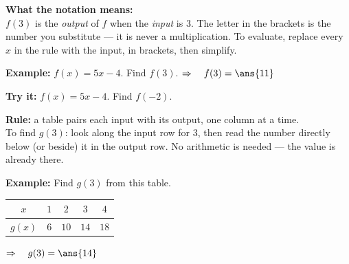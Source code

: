 \documentclass[12pt]{article}
\begin{document}


\begin{formulabox}
\textbf{What the notation means:}\\[3pt]
$f(3)$ is the \textit{output} of $f$ when the \textit{input} is $3$. The letter in the
brackets is the number you substitute --- it is never a multiplication.
To evaluate, replace every $x$ in the rule with the input, in brackets, then simplify.
\end{formulabox}

\begin{examplebox}
\textbf{Example:} \quad $f(x) = 5x - 4$. \quad Find $f(3)$.
$\Rightarrow\quad f(3) = \ans{11}$
\end{examplebox}

\begin{tryitbox}
\textbf{Try it:} \quad $f(x) = 5x - 4$. \quad Find $f(-2)$.\\[2pt]
\end{tryitbox}


\begin{formulabox}
\textbf{Rule:} a table pairs each input with its output, one column at a time.\\[3pt]
To find $g(3)$: look along the input row for $3$, then read the number directly below (or
beside) it in the output row. No arithmetic is needed --- the value is already there.
\end{formulabox}

\begin{examplebox}
\textbf{Example:} \quad Find $g(3)$ from this table.
\par\vspace{0.1cm}
\begin{center}
\begin{tabular}{|c|c|c|c|c|}
\hline
$x$ & $1$ & $2$ & $3$ & $4$ \\ \hline
$g(x)$ & $6$ & $10$ & $14$ & $18$ \\ \hline
\end{tabular}
\end{center}
$\Rightarrow\quad g(3) = \ans{14}$
\end{examplebox}
\end{document}
